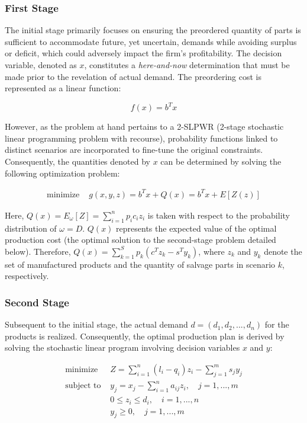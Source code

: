 		\subsubsection{First Stage}

		\qquad The initial stage primarily focuses on ensuring the preordered quantity of parts is sufficient to accommodate future, yet uncertain, demands while avoiding surplus or deficit, which could adversely impact the firm's profitability. The decision variable, denoted as $x$, constitutes a \textit{here-and-now} determination that must be made prior to the revelation of actual demand. The preordering cost is represented as a linear function:
		
		$$f(x) = b^T x$$
		
		However, as the problem at hand pertains to a 2-SLPWR (2-stage stochastic linear programming problem with recourse), probability functions linked to distinct scenarios are incorporated to fine-tune the original constraints. Consequently, the quantities denoted by $x$ can be determined by solving the following optimization problem:

		\begin{align*}
			\text{minimize } & g(x, y, z) = b^T x + Q(x) = b^T x + E[Z(z)]
		\end{align*}

		Here, $Q(x) = E_{\omega}[Z] = \sum_{i=1}^{n} p_i c_i z_i$ is taken with respect to the probability distribution of $\omega = D$. $Q(x)$ represents the expected value of the optimal production cost (the optimal solution to the second-stage problem detailed below). Therefore, $Q(x) = \sum_{k=1}^{S} p_k (c^T z_k - s^T y_k)$, where $z_{k}$ and $y_{k}$ denote the set of manufactured products and the quantity of salvage parts in scenario $k$, respectively.

		\subsubsection{Second Stage}

		\qquad Subsequent to the initial stage, the actual demand $d=(d_1,d_2,...,d_n)$ for the products is realized. Consequently, the optimal production plan is derived by solving the stochastic linear program involving decision variables $x$ and $y$:

		\begin{align*}
			\text{minimize } & Z = \sum^n_{i=1} (l_i - q_i) z_i - \sum^m_{j=1} s_j y_j \\
			\text{subject to } & y_j = x_j - \sum_{i=1}^n a_{ij} z_i, \quad j=1,...,m \\
			& 0 \leq z_i \leq d_i, \quad i=1,...,n \\
			& y_j \geq 0, \quad j=1,...,m
		\end{align*}

